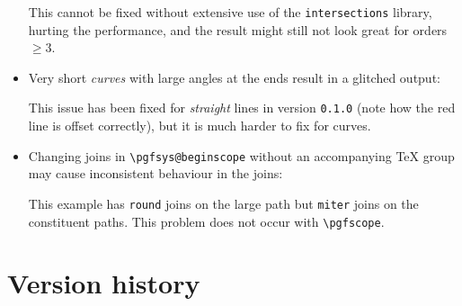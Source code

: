 \documentclass[12pt,a4paper]{article}
\makeatletter
\theoremstyle{definition}
\def\disablewarnings{\def\pgfutil@packagewarning##1##2{}}
\makeatother
\begin{document}
\begin{itemize}
\begin{tkzexample}[latex=3.5cm]
\end{tkzexample}
  This cannot be fixed without extensive use of the \texttt{intersections} library, hurting the performance, and the result might still not look great for orders $\geq 3$.
  \item Very short \emph{curves} with large angles at the ends result in a glitched output:\nopagebreak
\begin{tkzexample}[latex=3.75cm,pre=\disablewarnings]
\end{tkzexample}
  This issue has been fixed for \emph{straight} lines in version \texttt{0.1.0} (note how the red line is offset correctly), but it is much harder to fix for curves.
  \item Changing joins in \verb|\pgfsys@beginscope| without an accompanying \TeX{} group may cause inconsistent behaviour in the joins:
\begin{tkzexample}[latex=2cm]
\makeatletter
{}
\makeatother
\end{tkzexample}
  This example has \texttt{round} joins on the large path but \texttt{miter} joins on the constituent paths. This problem does not occur with \verb|\pgfscope|.
\end{itemize}

\newpage
\section{Version history}
\end{document}
